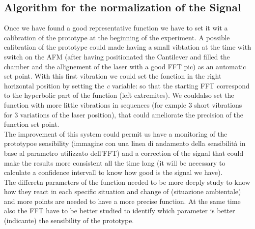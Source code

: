 \documentclass[11pt, a4paper]{article}
\begin{document}
\subsection{Algorithm for the normalization of the Signal}%

Once we have found a good representative function we have to set it wit a calibration of the prototype at the beginning of the experiment. 
A possible calibration of the prototype could made having a small vibtation at the time with switch on the AFM (after having positionated the Cantilever and filled the chamber and the allignement of the laser with a good FFT pic) as an automatic set point. With this first vibration we could set the fonction in the right horizontal position by setting the \textit{c} variable: so that the starting FFT correspond to the hyperbolic part of the function (left extremites). We couldalso set the function with more little vibrations in sequences (for exmple 3 short vibrations for 3 variations of the laser position), that could ameliorate the precision of the function set point. \\The improvement of this system could permit us have a monitoring of the prototypoe sensibility (immagine con una linea di andamento della sensibilità in base al parametro utilizzato dell'FFT) and a correction of the signal that could make the results more consistent all the time long (it will be necessary to calculate a confidence intervall to know how good is the signal we have).\\
The differetn parameters of the function needed to be more deeply study to know how they react in each specific situation and change of (situazione ambientale) and more points are needed to have a more precise function. At the same time also the FFT have to be better studied to identify which parameter is better (indicante) the sensibility of the prototype. 

\end{document}
